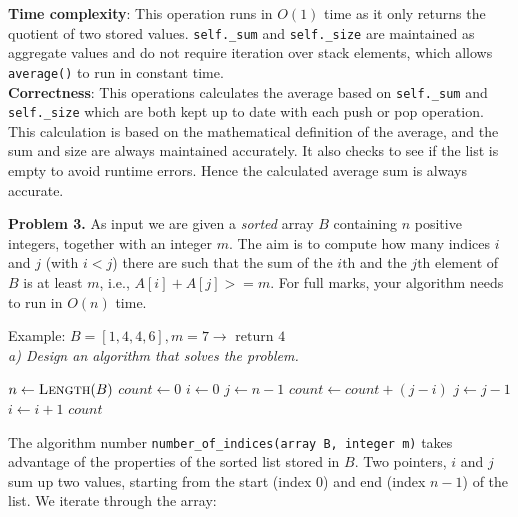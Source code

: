 \documentclass[12pt]{article}
\newcommand{\problem}[1]{\noindent \textbf{Problem #1.}}
\begin{document}
\textbf{Time complexity}: This operation runs in $O(1)$ time as it only returns the quotient of two stored values. \texttt{self.\_sum} and \texttt{self.\_size} are maintained as aggregate values and do not require iteration over stack elements, which allows \texttt{average()} to run in constant time.\\

\textbf{Correctness}: This operations calculates the average based on \texttt{self.\_sum} and \texttt{self.\_size} which are both kept up to date with each push or pop operation. This calculation is based on the mathematical definition of the average, and the sum and size are always maintained accurately. It also checks to see if the list is empty to avoid runtime errors. Hence the calculated average sum is always accurate.\\

\begin{algorithmic}[1]
        \State {}
    \Else
        \State {}
    \EndIf
\EndFunction
\end{algorithmic}

\newpage
\problem{3}  As input we are given a \textit{sorted} array $B$ containing $n$ positive integers, together with an integer $m$. The aim is to compute how many indices $i$ and $j$ (with $i < j$) there are such that the sum of the $i\text{th}$ and the $j\text{th}$ element of $B$ is at least $m$, i.e., $A[i] + A[j] >= m$. For full marks, your algorithm needs to run in $O(n)$ time.

Example:
$B = [1, 4, 4, 6], m = 7 \rightarrow \text{ return } 4$ \\

\textit{a) Design an algorithm that solves the problem.}

\begin{algorithmic}[1]
    \State $n \gets \Call{Length}{B}$
    \State $count \gets 0$
    \State $i \gets 0$
    \State $j \gets n - 1$
            \State $count \gets count + (j - i)$
            \State $j \gets j - 1$
        \Else
            \State $i \gets i + 1$
        \EndIf
    \EndWhile
    \State \Return $count$
\EndFunction
\end{algorithmic}

The algorithm number \texttt{number\_of\_indices(array B, integer m)} takes advantage of the properties of the sorted list stored in $B$. Two pointers, $i$ and $j$ sum up two values, starting from the start (index $0$) and end (index $n-1$) of the list. We iterate through the array:
\end{document}
